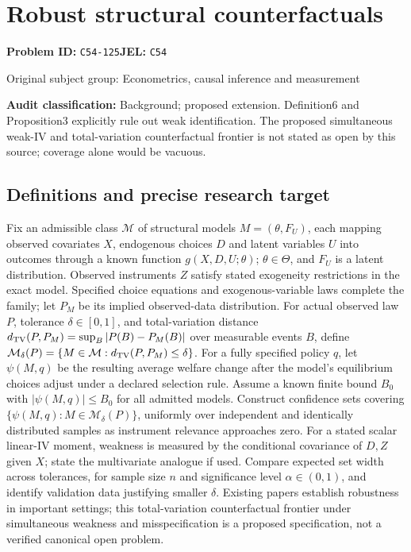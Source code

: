 \documentclass[11pt,a4paper]{article}
\begin{document}
\section*{Robust structural counterfactuals}
\textbf{Problem ID:} \texttt{C54-125}\quad \textbf{JEL:} \texttt{C54}\par
\label{problem:OP-0426}
{\sffamily\small\color{muted}Original subject group: Econometrics, causal inference and measurement\par}
\label{definitions:problem:30007708}
\textbf{Audit classification:} Background; proposed extension. Definition6 and Proposition3 explicitly rule out weak identification. The proposed simultaneous weak-IV and total-variation counterfactual frontier is not stated as open by this source; coverage alone would be vacuous.
\subsection*{Definitions and precise research target}
Fix an admissible class \(\mathcal M\) of structural models \(M=(\theta,F_U)\), each mapping observed covariates \(X\), endogenous choices \(D\) and latent variables \(U\) into outcomes through a known function \(g(X,D,U;\theta)\); \(\theta\in\Theta\), and \(F_U\) is a latent distribution. Observed instruments \(Z\) satisfy stated exogeneity restrictions in the exact model. Specified choice equations and exogenous-variable laws complete the family; let \(P_M\) be its implied observed-data distribution. For actual observed law \(P\), tolerance \(\delta\in[0,1]\), and total-variation distance \(d_{\rm TV}(P,P_M)=\sup_B|P(B)-P_M(B)|\) over measurable events \(B\), define \(\mathcal M_\delta(P)=\{M\in\mathcal M:d_{\rm TV}(P,P_M)\leq\delta\}\). For a fully specified policy \(q\), let \(\psi(M,q)\) be the resulting average welfare change after the model's equilibrium choices adjust under a declared selection rule. Assume a known finite bound \(B_0\) with \(|\psi(M,q)|\leq B_0\) for all admitted models. Construct confidence sets covering \(\{\psi(M,q):M\in\mathcal M_\delta(P)\}\), uniformly over independent and identically distributed samples as instrument relevance approaches zero. For a stated scalar linear-IV moment, weakness is measured by the conditional covariance of \(D,Z\) given \(X\); state the multivariate analogue if used. Compare expected set width across tolerances, for sample size \(n\) and significance level \(\alpha\in(0,1)\), and identify validation data justifying smaller \(\delta\). Existing papers establish robustness in important settings; this total-variation counterfactual frontier under simultaneous weakness and misspecification is a proposed specification, not a verified canonical open problem.
\end{document}
